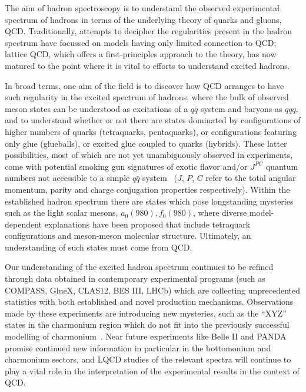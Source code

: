 The aim of hadron spectroscopy is to understand the observed experimental spectrum of hadrons in terms of the underlying theory of quarks and gluons, QCD. Traditionally, attempts to decipher the regularities present in the hadron spectrum have focussed on models having only limited connection to QCD; lattice QCD, which offers a first-principles approach to the theory, has now matured to the point where it is vital to efforts to understand excited hadrons.

In broad terms, one aim of the field is to discover how QCD arranges to have such regularity in the excited spectrum of hadrons, where the bulk of observed meson states can be understood as excitations of a $q\bar{q}$ system and baryons as $qqq$, and to understand whether or not there are states dominated by configurations of higher numbers of quarks (tetraquarks, pentaquarks), or configurations featuring only glue (glueballs), or excited glue coupled to quarks (hybrids). These latter possibilities, most of which are not yet unambiguously observed in experiments, come with potential smoking gun signatures of exotic flavor and/or $J^{PC}$ quantum numbers not accessible to a simple $q\bar{q}$ system~\cite{Meyer:2015eta} ($J$, $P$, $C$ refer to the total angular momentum, parity and charge conjugation properties respectively). Within the established hadron spectrum there are states which pose longstanding mysteries such as the light scalar mesons, $a_0(980), f_0(980)$, where diverse model-dependent explanations have been proposed that include tetraquark configurations and meson-meson molecular structure. Ultimately, an understanding of such states must come from QCD.

Our understanding of the excited hadron spectrum continues to be refined through data obtained in contemporary experimental programs (such as COMPASS, GlueX, CLAS12, BES III, LHCb) which are collecting unprecedented statistics with both established and novel production mechanisms. Observations made by these experiments are introducing new mysteries, such as the ``XYZ'' states in the charmonium region which do not fit into the previously successful modelling of charmonium~\cite{Lebed:2016hpi}. Near future experiments like Belle II and PANDA promise continued new information in particular in the bottomonium and charmonium sectors, and LQCD studies of the relevant spectra will continue to play a vital role in the interpretation of the experimental results in the context of QCD.


